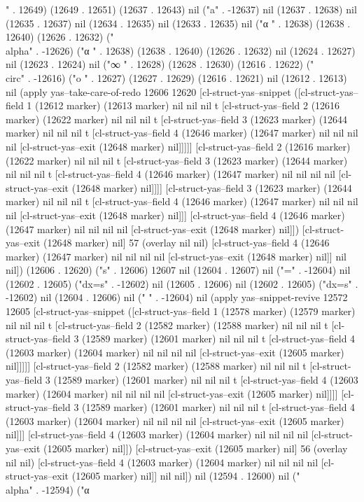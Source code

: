 " . 12649) (12649 . 12651) (12637 . 12643) nil ("a" . -12637) nil (12637 . 12638) nil (12635 . 12637) nil (12634 . 12635) nil (12633 . 12635) nil ("α
" . 12638) (12638 . 12640) (12626 . 12632) ("\\alpha" . -12626) ("α
" . 12638) (12638 . 12640) (12626 . 12632) nil (12624 . 12627) nil (12623 . 12624) nil ("∞
" . 12628) (12628 . 12630) (12616 . 12622) ("\\circ" . -12616) ("o
" . 12627) (12627 . 12629) (12616 . 12621) nil (12612 . 12613) nil (apply yas--take-care-of-redo 12606 12620 [cl-struct-yas--snippet ([cl-struct-yas--field 1 (12612 marker) (12613 marker) nil nil nil t [cl-struct-yas--field 2 (12616 marker) (12622 marker) nil nil nil t [cl-struct-yas--field 3 (12623 marker) (12644 marker) nil nil nil t [cl-struct-yas--field 4 (12646 marker) (12647 marker) nil nil nil nil [cl-struct-yas--exit (12648 marker) nil]]]]] [cl-struct-yas--field 2 (12616 marker) (12622 marker) nil nil nil t [cl-struct-yas--field 3 (12623 marker) (12644 marker) nil nil nil t [cl-struct-yas--field 4 (12646 marker) (12647 marker) nil nil nil nil [cl-struct-yas--exit (12648 marker) nil]]]] [cl-struct-yas--field 3 (12623 marker) (12644 marker) nil nil nil t [cl-struct-yas--field 4 (12646 marker) (12647 marker) nil nil nil nil [cl-struct-yas--exit (12648 marker) nil]]] [cl-struct-yas--field 4 (12646 marker) (12647 marker) nil nil nil nil [cl-struct-yas--exit (12648 marker) nil]]) [cl-struct-yas--exit (12648 marker) nil] 57 (overlay nil nil) [cl-struct-yas--field 4 (12646 marker) (12647 marker) nil nil nil nil [cl-struct-yas--exit (12648 marker) nil]] nil nil]) (12606 . 12620) ("s" . 12606) 12607 nil (12604 . 12607) nil ("=" . -12604) nil (12602 . 12605) ("dx=s" . -12602) nil (12605 . 12606) nil (12602 . 12605) ("dx=s" . -12602) nil (12604 . 12606) nil (" " . -12604) nil (apply yas--snippet-revive 12572 12605 [cl-struct-yas--snippet ([cl-struct-yas--field 1 (12578 marker) (12579 marker) nil nil nil t [cl-struct-yas--field 2 (12582 marker) (12588 marker) nil nil nil t [cl-struct-yas--field 3 (12589 marker) (12601 marker) nil nil nil t [cl-struct-yas--field 4 (12603 marker) (12604 marker) nil nil nil nil [cl-struct-yas--exit (12605 marker) nil]]]]] [cl-struct-yas--field 2 (12582 marker) (12588 marker) nil nil nil t [cl-struct-yas--field 3 (12589 marker) (12601 marker) nil nil nil t [cl-struct-yas--field 4 (12603 marker) (12604 marker) nil nil nil nil [cl-struct-yas--exit (12605 marker) nil]]]] [cl-struct-yas--field 3 (12589 marker) (12601 marker) nil nil nil t [cl-struct-yas--field 4 (12603 marker) (12604 marker) nil nil nil nil [cl-struct-yas--exit (12605 marker) nil]]] [cl-struct-yas--field 4 (12603 marker) (12604 marker) nil nil nil nil [cl-struct-yas--exit (12605 marker) nil]]) [cl-struct-yas--exit (12605 marker) nil] 56 (overlay nil nil) [cl-struct-yas--field 4 (12603 marker) (12604 marker) nil nil nil nil [cl-struct-yas--exit (12605 marker) nil]] nil nil]) nil (12594 . 12600) nil ("\\alpha" . -12594) ("α

